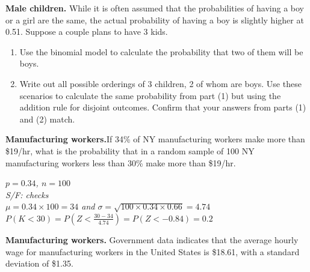 \documentclass[12pt]{article}
\newcommand{\soln}[2]{\textit{\textcolor{custom_red}{#2}}}{}
\newcommand{\qt}[1]{\textcolor{custom_carnelian}{\textbf{#1.}}}
\begin{document}


\qt{Male children\label{male_children}} While it is often assumed that the 
probabilities of having a boy or a girl are the same, the actual probability 
of having a boy is slightly higher at 0.51. Suppose a couple plans to have 3 
kids. 
\begin{enumerate}
\item Use the binomial model to calculate the probability that two of them 
will be boys.

\vspace{1cm}
\item Write out all possible orderings of 3 children, 2 of whom are boys. Use 
these scenarios to calculate the same probability from part (1) but using the 
addition rule for disjoint outcomes. Confirm that your answers from parts (1) 
and (2) match.

\vspace{3cm}
\end{enumerate}


\qt{Manufacturing workers\label{manufacturing_avg}}If 34\% of NY manufacturing workers make more than \$19/hr, what is the probability that in a random sample of 100 NY manufacturing workers less than 30\% make more than \$19/hr.

\soln{2cm}{
$p = 0.34$, $n = 100$ \\
S/F: checks \\
$\mu = 0.34 \times 100 = 34$ and $\sigma = \sqrt{100 \times 0.34 \times 0.66} = 4.74$ \\
$P \left( K < 30 \right) = P \left( Z < \frac{30 - 34}{4.74} \right) = P(Z < -0.84) = 0.2$
}



\clearpage

\qt{Manufacturing workers\label{manufacturing_avg}} Government data indicates that the average hourly wage for manufacturing workers in the United States is \$18.61, 
with a standard deviation of \$1.35. 
\end{document}
